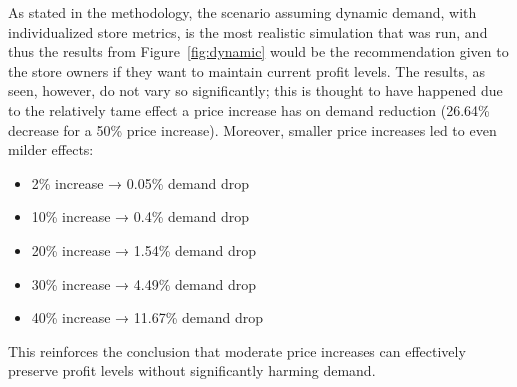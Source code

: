 \documentclass[a4paper,12pt]{article}
\begin{document}
As stated in the methodology, the scenario assuming dynamic demand, with individualized store metrics, is the most realistic simulation that was run, and thus the results from Figure~\ref{fig:dynamic} would be the recommendation given to the store owners if they want to maintain current profit levels. The results, as seen, however, do not vary so significantly; this is thought to have happened due to the relatively tame effect a price increase has on demand reduction (26.64\% decrease for a 50\% price increase). Moreover, smaller price increases led to even milder effects:
\begin{itemize}
    \item 2\% increase → 0.05\% demand drop
    \item 10\% increase → 0.4\% demand drop
    \item 20\% increase → 1.54\% demand drop
    \item 30\% increase → 4.49\% demand drop
    \item 40\% increase → 11.67\% demand drop
\end{itemize}

This reinforces the conclusion that moderate price increases can effectively preserve profit levels without significantly harming demand.
\end{document}
